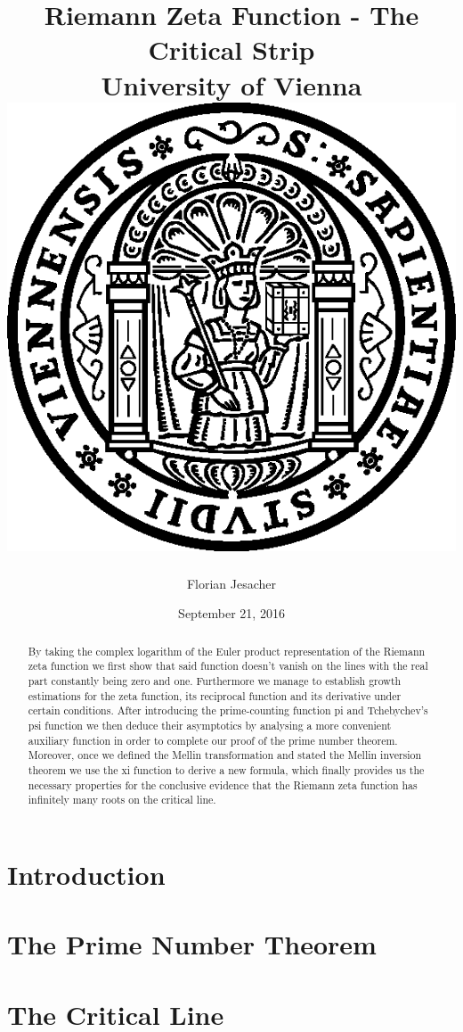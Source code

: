 \documentclass[11pt]{report}
\begin{document}
\title{
	{Riemann Zeta Function - The Critical Strip}\\
	{\large University of Vienna}\\
	{\vspace{3ex}\includegraphics[width=15ex]{University.png}}
}
\author{Florian Jesacher}
\date{September 21, 2016}
\maketitle

\begin{abstract}
By taking the complex logarithm of the Euler product representation of the Riemann zeta function we first show that said function doesn't vanish on the lines with the real part constantly being zero and one. Furthermore we manage to establish growth estimations for the zeta function, its reciprocal function and its derivative under certain conditions. After introducing the prime-counting function pi and Tchebychev's psi function we then deduce their asymptotics by analysing a more convenient auxiliary function in order to complete our proof of the prime number theorem. Moreover, once we defined the Mellin transformation and stated the Mellin inversion theorem we use the xi function to derive a new formula, which finally provides us the necessary properties for the conclusive evidence that the Riemann zeta function has infinitely many roots on the critical line.
\end{abstract}

\tableofcontents

\chapter{Introduction}


\chapter{The Prime Number Theorem}


\chapter{The Critical Line}


\appendix


\nocite{*}
\end{document}
